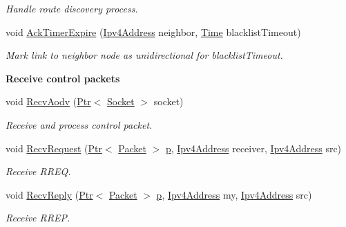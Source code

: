 \begin{DoxyCompactItemize}
\begin{DoxyCompactList}\small\item\em Handle route discovery process. \end{DoxyCompactList}\item 
void \hyperlink{classns3_1_1aodv_1_1RoutingProtocol_aa98fb4cc6871a7f5e918c4992a05b813}{Ack\+Timer\+Expire} (\hyperlink{classns3_1_1Ipv4Address}{Ipv4\+Address} neighbor, \hyperlink{classns3_1_1Time}{Time} blacklist\+Timeout)
\begin{DoxyCompactList}\small\item\em Mark link to neighbor node as unidirectional for blacklist\+Timeout. \end{DoxyCompactList}\end{DoxyCompactItemize}
\begin{Indent}{\bf Receive control packets}\par
\begin{DoxyCompactItemize}
\item 
void \hyperlink{classns3_1_1aodv_1_1RoutingProtocol_a08c44000f66533e69bde85d68d75c354}{Recv\+Aodv} (\hyperlink{classns3_1_1Ptr}{Ptr}$<$ \hyperlink{classns3_1_1Socket}{Socket} $>$ socket)
\begin{DoxyCompactList}\small\item\em Receive and process control packet. \end{DoxyCompactList}\item 
void \hyperlink{classns3_1_1aodv_1_1RoutingProtocol_adc8555f0e1e8ba05ea80a412b412d064}{Recv\+Request} (\hyperlink{classns3_1_1Ptr}{Ptr}$<$ \hyperlink{classns3_1_1Packet}{Packet} $>$ \hyperlink{lte__link__budget__x2__handover__measures_8m_ac9de518908a968428863f829398a4e62}{p}, \hyperlink{classns3_1_1Ipv4Address}{Ipv4\+Address} receiver, \hyperlink{classns3_1_1Ipv4Address}{Ipv4\+Address} src)
\begin{DoxyCompactList}\small\item\em Receive R\+R\+EQ. \end{DoxyCompactList}\item 
void \hyperlink{classns3_1_1aodv_1_1RoutingProtocol_a15459eff0cb816e8d03a73c78d9cdc9d}{Recv\+Reply} (\hyperlink{classns3_1_1Ptr}{Ptr}$<$ \hyperlink{classns3_1_1Packet}{Packet} $>$ \hyperlink{lte__link__budget__x2__handover__measures_8m_ac9de518908a968428863f829398a4e62}{p}, \hyperlink{classns3_1_1Ipv4Address}{Ipv4\+Address} my, \hyperlink{classns3_1_1Ipv4Address}{Ipv4\+Address} src)
\begin{DoxyCompactList}\small\item\em Receive R\+R\+EP. \end{DoxyCompactList}\item 

\end{DoxyCompactItemize}
\end{Indent}
